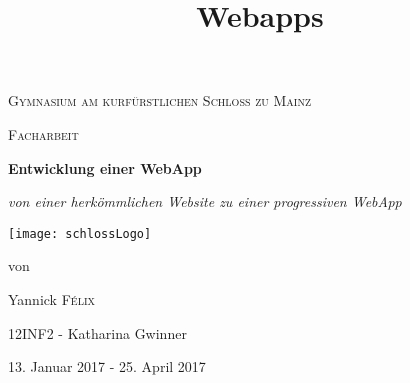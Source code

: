 \documentclass[a4paper,12pt,ngerman,listof=numbered]{scrartcl}      %
\title{Webapps}  %
\begin{document}
	
	\begin{titlepage}
		\centering
		{\scshape\Large Gymnasium am kurf\"{u}rstlichen Schloss zu Mainz \par}
		\vspace{0.5cm}
		{\scshape\Large Facharbeit\par}
		\vspace{2.5cm}
		{\huge\bfseries Entwicklung einer WebApp\par}
		\vspace{1cm}
		{\Large\itshape von einer herkömmlichen Website zu einer progressiven WebApp\par}
		\vfill
		{
			\texttt{[image: schlossLogo]}\par
		}
		\vfill
		von\par
		Yannick \textsc{F\'elix}\par
		{\small 12INF2 - Katharina Gwinner}
		
		\vspace{3cm}
		
		{\large 13. Januar 2017 - 25. April 2017 \par}
		\newpage
	\end{titlepage}
	\setcounter{page}{1}
\end{document}
